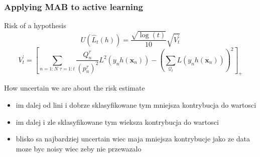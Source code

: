 \documentclass{beamer}
\begin{document}
  \begin{frame}
  \frametitle{Applying MAB to active learning}
  \begin{alertblock}{Risk of a hypothesis}
  $$U(\hat{L}_t(h)) = \frac{ \sqrt{ \log(t) } }
                       { 10 }
                  \sqrt{ V^\prime_t }$$
  $$V^\prime_t = \left[
  \sum_{n = 1:N \text{~} \tau = 1:t} \frac{Q^\tau_n}{(p^\tau_n)^2} L^2(y_n h(\mathbf{x}_n))
  -
  \left( \sum_{\mathscr{Q}_t} L(y_n h(\mathbf{x}_n)) \right)^2
\right]_+$$
  \end{alertblock}
  \begin{block}{How uncertain we are about the risk estimate}
    \begin{itemize}
      \item im dalej od lini i dobrze sklasyfikowane tym mniejsza kontrybucja do wartosci
      \item im dalej i zle sklasyfikowane tym wieksza kontrybucja do wartosci
      \item blisko sa najbardziej uncertain wiec maja mniejsza kontrybucje jako ze data moze byc noisy wiec zeby nie przewazalo
    \end{itemize}
  \end{block}
  \end{frame}
\end{document}
